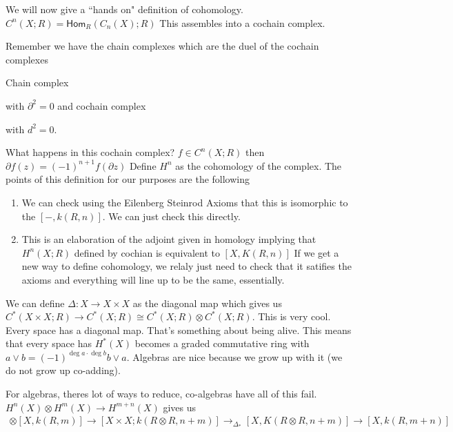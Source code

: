 \documentclass[12pt]{article}
\theoremstyle{definition}
\begin{document}
	We will now give a ``hands on" definition of cohomology. $C^n(X;R)=\mathsf{Hom}_R(C_n(X);R)$ This assembles into a cochain complex. 
	
	Remember we have the chain complexes which are the duel of the cochain complexes\begin{center} Chain complex
		with $\partial^2=0$ and cochain complex 
		with $d^2=0$. 
	\end{center}
	What happens in this cochain complex? $f\in C^n(X;R)$ then $\partial f(z)=(-1)^{n+1}f(\partial z)$ Define $H^n$ as the cohomology of the complex. The points of this definition for our purposes are the following\begin{enumerate}
		\item We can check using the Eilenberg Steinrod Axioms that this is isomorphic to the $[-,k(R,n)]$. We can just check this directly.
		\item This is an elaboration of the adjoint given in homology implying that $H^n(X;R)$ defined by cochian is equivalent to $[X,K(R,n)]$ If we get a new way to define cohomology, we relaly just need to check that it satifies the axioms and everything will line up to be the same, essentially. 
	\end{enumerate}
	We can define $\Delta:X\to X\times X$ as the diagonal map which gives us $C^\ast(X\times X; R)\to C^\ast(X;R)\cong C^\ast(X;R)\otimes C^\ast (X;R)$. This is very cool. Every space has a diagonal map. That's something about being alive. This means that every space has $H^*(X)$ becomes a graded commutative ring with $a\vee b=(-1)^{\deg a\cdot \deg b} b\vee a$. Algebras are nice because we grow up with it (we do not grow up co-adding). 
	
	For algebras, theres lot of ways to reduce, co-algebras have all of this fail. $H^n(X)\otimes H^m(X)\to H^{m+n}(X)$ gives us \begin{align*}
	[X,k(R,n)]\otimes [X,k(R,m)]\to [X\times X; k(R\otimes R,n+m)]\to_{\Delta_\ast} [X,K(R\otimes R, n+m)]\to [X,k(R,m+n)]
	\end{align*}
\end{document}

